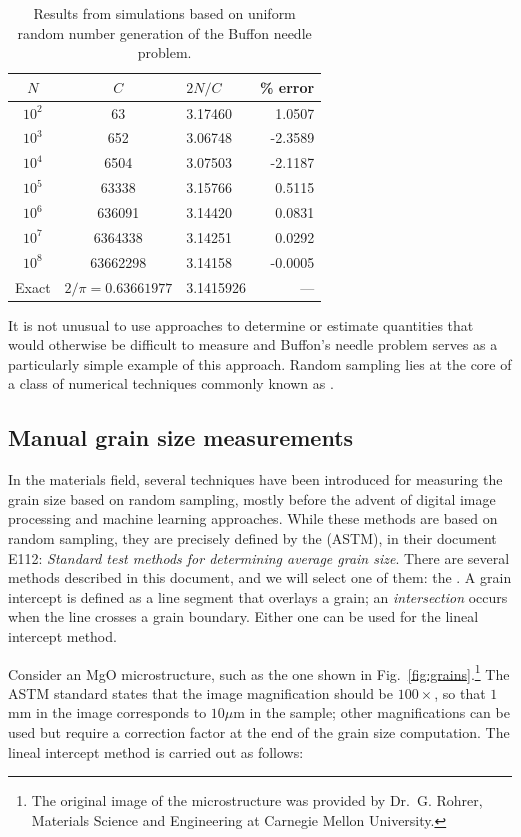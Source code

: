 \begin{table}[t!]
\centering\leavevmode
\begin{tabular}{|c|c|l|r|}
\hline
$N$ & $C$ &  $2N/C$ & \% error\\
\hline\hline
$10^{2}$ & 63&3.17460& 1.0507\\
$10^{3}$ & 652 &3.06748& -2.3589\\
$10^{4}$ & 6504 & 3.07503& -2.1187\\
$10^{5}$ & 63338 &3.15766& 0.5115\\
$10^{6}$ & 636091 & 3.14420& 0.0831\\
$10^{7}$ & 6364338 &3.14251& 0.0292\\
$10^{8}$ & 63662298 & 3.14158&-0.0005\\
\hline
Exact & $2/\pi=0.63661977$&3.1415926&---\\
\hline
\end{tabular}
\caption{\label{\chabbr:tb:buffon}Results from simulations based on uniform random number generation of the Buffon needle problem.}
\end{table}

It is not unusual to use  approaches to determine or estimate quantities that would otherwise be difficult to measure and Buffon's needle problem serves as a particularly simple example of this approach. Random sampling lies at the core of a class of numerical techniques commonly known as .


\subsection{Manual grain size measurements}
In the materials field, several techniques have been introduced for measuring the grain size based on random sampling, mostly before the advent of digital image processing and machine learning approaches.  While these methods are based on random sampling, they are precisely defined by the  (ASTM), in their document E112: \textit{Standard test methods for determining average grain size}. There are several methods described in this document, and we will select one of them: the . A grain intercept is defined as a line segment that overlays a grain; an \textit{intersection} occurs when the line crosses a grain boundary. Either one can be used for the lineal intercept method.

Consider an MgO microstructure, such as the one shown in Fig.~\ref{fig:grains}.\footnote{The original image of the microstructure was provided by Dr.\ G. Rohrer, Materials Science and Engineering at Carnegie Mellon University.}  The ASTM standard states that the image magnification should be $100\times$, so that $1$ mm in the image corresponds to $10 \mu$m in the sample; other magnifications can be used but require a correction factor at the end of the grain size computation.  The lineal intercept method is carried out as follows:

